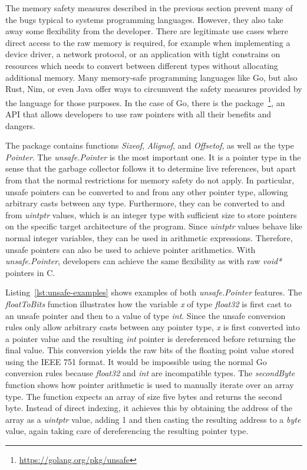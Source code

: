 The memory safety measures described in the previous section prevent many of the bugs typical to systems programming
languages.
However, they also take away some flexibility from the developer.
There are legitimate use cases where direct access to the raw memory is required, for example when implementing a
device driver, a network protocol, or an application with tight constrains on resources which needs to convert between
different types without allocating additional memory.
Many memory-safe programming languages like Go, but also Rust, Nim, or even Java offer ways to circumvent the safety
measures provided by the language for those purposes.
In the case of Go, there is the \unsafe{} package~\footnote{\url{https://golang.org/pkg/unsafe}}, an \acrshort{API} that
allows developers to use raw pointers with all their benefits and dangers.

The package contains  functions \textit{Sizeof}, \textit{Alignof}, and \textit{Offsetof}, as well as the
type \textit{Pointer}.
The \textit{unsafe.Pointer} is the most important one.
It is a pointer type in the sense that the garbage collector follows it to determine live references, but apart from
that the normal restrictions for memory safety do not apply.
In particular, unsafe pointers can be converted to and from any other pointer type, allowing arbitrary casts between
any type.
Furthermore, they can be converted to and from \textit{uintptr} values, which is an integer type with sufficient size
to store pointers on the specific target architecture of the program.
Since \textit{uintptr} values behave like normal integer variables, they can be used in arithmetic expressions.
Therefore, unsafe pointers can also be used to achieve pointer arithmetics.
With \textit{unsafe.Pointer}, developers can achieve the same flexibility as with raw \textit{void*} pointers in C.

Listing~\ref{lst:unsafe-examples} shows examples of both \textit{unsafe.Pointer} features.
The \textit{floatToBits} function illustrates how the variable \textit{x} of type \textit{float32} is first cast to an
unsafe pointer and then to a value of type \textit{int}.
Since the unsafe conversion rules only allow arbitrary casts between any pointer type, \textit{x} is first converted
into a pointer value and the resulting \textit{int} pointer is dereferenced before returning the final value.
This conversion yields the raw bits of the floating point value stored using the IEEE 751 format.
It would be impossible using the normal Go conversion rules because \textit{float32} and \textit{int} are incompatible
types.
The \textit{secondByte} function shows how pointer arithmetic is used to manually iterate over an array type.
The function expects an array of size five bytes and returns the second byte.
Instead of direct indexing, it achieves this by obtaining the address of the array as a \textit{uintptr} value, adding
1 and then casting the resulting address to a \textit{byte} value, again taking care of dereferencing the resulting
pointer type.

